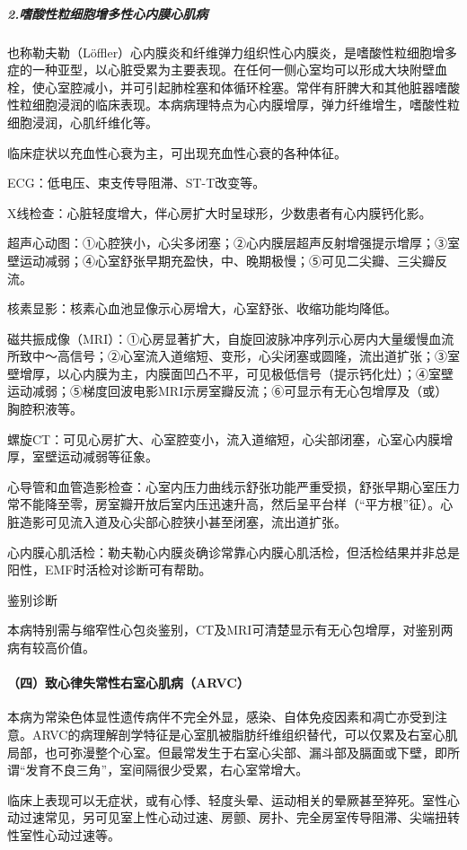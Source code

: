 \subparagraph{2.嗜酸性粒细胞增多性心内膜心肌病}

也称勒夫勒（Löffler）心内膜炎和纤维弹力组织性心内膜炎，是嗜酸性粒细胞增多症的一种亚型，以心脏受累为主要表现。在任何一侧心室均可以形成大块附壁血栓，使心室腔减小，并可引起肺栓塞和体循环栓塞。常伴有肝脾大和其他脏器嗜酸性粒细胞浸润的临床表现。本病病理特点为心内膜增厚，弹力纤维增生，嗜酸性粒细胞浸润，心肌纤维化等。

临床症状以充血性心衰为主，可出现充血性心衰的各种体征。

ECG：低电压、束支传导阻滞、ST-T改变等。

X线检查：心脏轻度增大，伴心房扩大时呈球形，少数患者有心内膜钙化影。

超声心动图：①心腔狭小，心尖多闭塞；②心内膜层超声反射增强提示增厚；③室壁运动减弱；④心室舒张早期充盈快，中、晚期极慢；⑤可见二尖瓣、三尖瓣反流。

核素显影：核素心血池显像示心房增大，心室舒张、收缩功能均降低。

磁共振成像（MRI）：①心房显著扩大，自旋回波脉冲序列示心房内大量缓慢血流所致中～高信号；②心室流入道缩短、变形，心尖闭塞或圆隆，流出道扩张；③室壁增厚，以心内膜为主，内膜面凹凸不平，可见极低信号（提示钙化灶）；④室壁运动减弱；⑤梯度回波电影MRI示房室瓣反流；⑥可显示有无心包增厚及（或）胸腔积液等。

螺旋CT：可见心房扩大、心室腔变小，流入道缩短，心尖部闭塞，心室心内膜增厚，室壁运动减弱等征象。

心导管和血管造影检查：心室内压力曲线示舒张功能严重受损，舒张早期心室压力常不能降至零，房室瓣开放后室内压迅速升高，然后呈平台样（“平方根”征）。心脏造影可见流入道及心尖部心腔狭小甚至闭塞，流出道扩张。

心内膜心肌活检：勒夫勒心内膜炎确诊常靠心内膜心肌活检，但活检结果并非总是阳性，EMF时活检对诊断可有帮助。

鉴别诊断

本病特别需与缩窄性心包炎鉴别，CT及MRI可清楚显示有无心包增厚，对鉴别两病有较高价值。

\paragraph{（四）致心律失常性右室心肌病（ARVC）}

本病为常染色体显性遗传病伴不完全外显，感染、自体免疫因素和凋亡亦受到注意。ARVC的病理解剖学特征是心室肌被脂肪纤维组织替代，可以仅累及右室心肌局部，也可弥漫整个心室。但最常发生于右室心尖部、漏斗部及膈面或下壁，即所谓“发育不良三角”，室间隔很少受累，右心室常增大。

临床上表现可以无症状，或有心悸、轻度头晕、运动相关的晕厥甚至猝死。室性心动过速常见，另可见室上性心动过速、房颤、房扑、完全房室传导阻滞、尖端扭转性室性心动过速等。

